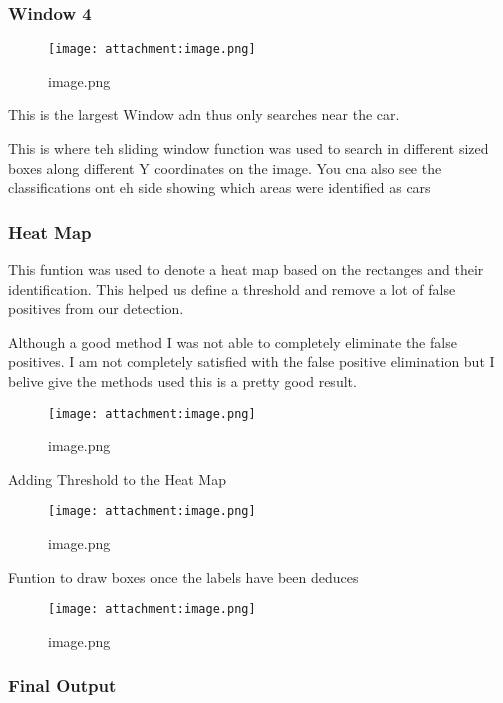 \documentclass[11pt]{article}
\makeatletter
\def\maxwidth{\ifdim\Gin@nat@width>\linewidth\linewidth
    \else\Gin@nat@width\fi}
\let\Oldincludegraphics\includegraphics
\renewcommand{\includegraphics}[1]{\Oldincludegraphics[width=.8\maxwidth]{#1}}
\makeatother
\begin{document}
    \hypertarget{window-4}{%
\subsubsection{Window 4}\label{window-4}}

\begin{figure}
\centering
\texttt{[image: attachment:image.png]}
\caption{image.png}
\end{figure}

This is the largest Window adn thus only searches near the car.

This is where teh sliding window function was used to search in
different sized boxes along different Y coordinates on the image. You
cna also see the classifications ont eh side showing which areas were
identified as cars

    \hypertarget{heat-map}{%
\subsubsection{Heat Map}\label{heat-map}}

This funtion was used to denote a heat map based on the rectanges and
their identification. This helped us define a threshold and remove a lot
of false positives from our detection.

Although a good method I was not able to completely eliminate the false
positives. I am not completely satisfied with the false positive
elimination but I belive give the methods used this is a pretty good
result.

\begin{figure}
\centering
\texttt{[image: attachment:image.png]}
\caption{image.png}
\end{figure}

    Adding Threshold to the Heat Map

\begin{figure}
\centering
\texttt{[image: attachment:image.png]}
\caption{image.png}
\end{figure}

    Funtion to draw boxes once the labels have been deduces

\begin{figure}
\centering
\texttt{[image: attachment:image.png]}
\caption{image.png}
\end{figure}

    \hypertarget{final-output}{%
\subsubsection{Final Output}\label{final-output}}
\end{document}
